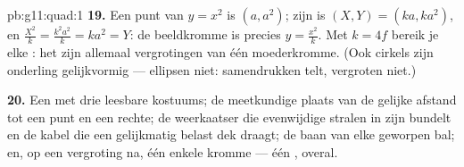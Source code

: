 \begin{solution}{pb:g11:quad:1}
\textbf{19.} Een punt van $y = x^2$ is $(a, a^2)$; zijn  is
$(X, Y) = (ka, ka^2)$, en $\frac{X^2}{k} = \frac{k^2a^2}{k} = ka^2 = Y$: de
beeldkromme is precies $y = \frac{x^2}{k}$. Met $k = 4f$ bereik je elke
: het zijn allemaal vergrotingen van één moederkromme. (Ook cirkels
zijn onderling gelijkvormig --- ellipsen niet: samendrukken telt, vergroten
niet.)

\textbf{20.} Een  met drie leesbare kostuums; de meetkundige
plaats van de gelijke afstand tot een punt en een rechte; de weerkaatser die
evenwijdige stralen in zijn  bundelt en de kabel die een
gelijkmatig belast dek draagt; de baan van elke geworpen bal; en, op een
vergroting na, één enkele kromme --- één , overal.
\end{solution}
